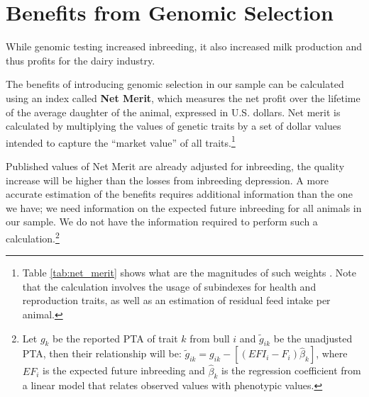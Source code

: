 \documentclass[12pt,letterpaper]{article}
\begin{document}

\section{Benefits from Genomic Selection\label{sec:benefit}} 
While genomic testing increased inbreeding, it also increased milk production and thus profits for the dairy industry.

The benefits of introducing genomic selection in our sample can be calculated using an index called \textbf{Net Merit}, which measures the net profit over the lifetime of the average daughter of the animal, expressed in U.S. dollars. Net merit is calculated by multiplying the values of genetic traits by a set of dollar values intended to capture the ``market value'' of all traits.\footnote{Table \ref{tab:net_merit} shows what are the magnitudes of such weights \citep{VanRaden2021}. Note that the calculation involves the usage of subindexes for health and reproduction traits, as well as an estimation of residual feed intake per animal.}

Published values of Net Merit are already adjusted for inbreeding, the quality increase will be higher than the losses from inbreeding depression. A more accurate estimation of the benefits requires additional information than the one we have; we need information on the expected future inbreeding for all animals in our sample. We do not have the information required to perform such a calculation.\footnote{Let $g_{k}$ be the reported PTA of trait $k$ from bull $i$ and $\tilde{g}_{ik}$ be the unadjusted PTA, then their relationship will be: $\tilde{g}_{ik}=g_{ik}-\left[(EFI_{i}-F_{i})\hat{\beta}_{k}\right]$, where $EF_{i}$ is the expected future inbreeding and $\hat{\beta}_{k}$ is the regression coefficient from a linear model that relates observed values with phenotypic values.} 
\end{document}
